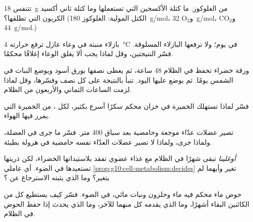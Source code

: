 \begin{exercise}[$\star\star$]\label{exo:g10:cell-metabolism:8}
 تتنفس \qty{18}{g} من الغلوكوز. ما كتلة الأكسجين التي تستعملها وما
كتلة ثاني أكسيد الكربون التي تطلقها؟ (الكتل المولية: الغلوكوز
\qty{180}{g/mol}، و$\mathrm{O_2}$ \qty{32}{g/mol}،
و$\mathrm{CO_2}$ \qty{44}{g/mol}.)
\end{exercise}

\begin{exercise}[$\star\star$]\label{exo:g10:cell-metabolism:9}
بازلاء منبتة في وعاء عازل ترفع حرارته \qty{4}{\celsius} في يوم؛ ولا
ترفعها البازلاء المسلوقة. فسّر النتيجتين، وقل لماذا يجب ألا يغلق
الوعاء إغلاقًا محكمًا.
\end{exercise}

\begin{exercise}[$\star\star$]\label{exo:g10:cell-metabolism:10}
ورقة خضراء تحفظ في الظلام 48 ساعة، ثم يغطى نصفها بورق أسود ويوضع
النبات في الشمس يومًا. ثم يوضع عليها اليود. تنبأ بالنتيجة على كل نصف
وفسّرها، وقل لماذا لزمت الساعات الثماني والأربعون من الظلام.
\end{exercise}

\begin{exercise}[$\star\star$]\label{exo:g10:cell-metabolism:11}
فسّر لماذا تستهلك الخميرة في خزان محكم سكرًا أسرع بكثير، لكل ، من
الخميرة التي يمرر فيها الهواء.
\end{exercise}

\begin{exercise}[$\star\star\star$]\label{exo:g10:cell-metabolism:12}
تصير عضلات عدّاء موجعة وحامضية بعد سباق 400 متر. فسّر ما جرى في 
العضلة، ولماذا جرى، ولماذا لا تصير عضلات العدّاء نفسه حامضية في هرولة
بطيئة.
\end{exercise}

\begin{exercise}[$\star\star\star$]\label{exo:g10:cell-metabolism:13}
\emph{أوغلينا} تبقى شهرًا في الظلام مع غذاء عضوي تفقد بلاستيداتها
الخضراء، لكن ذريتها تستعيدها في الضوء. أي عاملي
\cref{prop:g10:cell-metabolism:decides} تغير وأيهما لم يتغير؟ وما الذي
يثبته الاسترجاع عن  ؟
\end{exercise}

\begin{exercise}[$\star\star\star$]\label{exo:g10:cell-metabolism:14}
حوض ماء محكم فيه ماء وحلزون ونبات مائي، في الضوء. فسّر كيف يستطيع كل
من الكائنين البقاء أشهرًا، وما الذي يقدمه كل منهما للآخر، وما الذي
يحدث إذا حفظ الحوض في الظلام.
\end{exercise}

